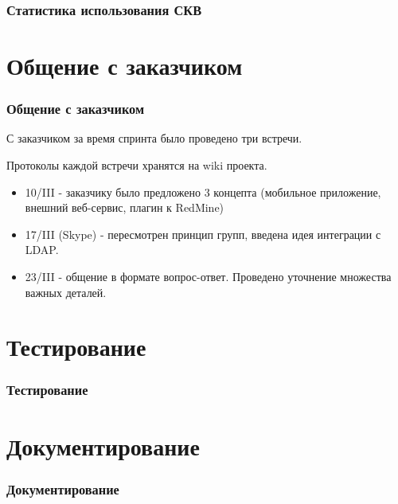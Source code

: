 \documentclass{beamer}
\begin{document}
\begin{frame}
\frametitle{Статистика использования СКВ}



\end{frame}

\section{Общение с заказчиком}

\begin{frame}
\frametitle{Общение с заказчиком}

С заказчиком за время спринта было проведено три встречи.

Протоколы каждой встречи хранятся на wiki проекта.

\begin{itemize}
\item 10/III - заказчику было предложено 3 концепта (мобильное приложение, внешний веб-сервис, плагин к RedMine)
\item 17/III (Skype) - пересмотрен принцип групп, введена идея интеграции с LDAP.
\item 23/III - общение в формате вопрос-ответ. Проведено уточнение множества важных деталей.
\end{itemize}

\end{frame}


\section{Тестирование}

\begin{frame}
\frametitle{Тестирование}



\end{frame}

\section{Документирование}

\begin{frame}
\frametitle{Документирование}



\end{frame}
\end{document}
